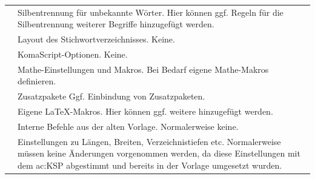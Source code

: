 \begin{longtable}{l@{\extracolsep{8pt}}x}
       & Silbentrennung für unbekannte Wörter.
                                                 Hier können ggf. Regeln für die Silbentrennung weiterer Begriffe hinzugefügt werden.\\
        & Layout des Stichwortverzeichnisses.
                                                 Keine.\\
       & KomaScript-Optionen.
                                                 Keine.\\
              & Mathe-Einstellungen und Makros.
                                                 Bei Bedarf eigene Mathe-Makros definieren.\\
        & Zusatzpakete
                                                 Ggf. Einbindung von Zusatzpaketen.\\
       & Eigene \LaTeX{}-Makros.
                                                 Hier können ggf. weitere hinzugefügt werden.\\
 & Interne Befehle aus der alten Vorlage.
                                                 Normalerweise keine.\\
          & Einstellungen zu Längen, Breiten, Verzeichnistiefen etc.
                                                 Normalerweise müssen keine Änderungen vorgenommen werden, 
                                                 da diese Einstellungen mit dem \gls{ac:KSP} abgestimmt 
                                                 und bereits in der Vorlage umgesetzt wurden.\\

\end{longtable}
